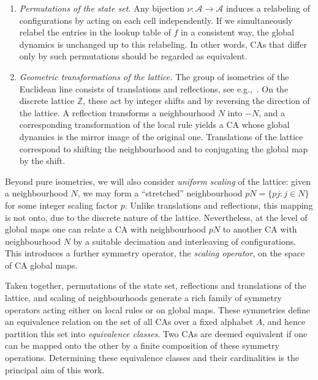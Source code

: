 \documentclass[a4paper]{article}
\begin{document}
\begin{enumerate}
  \item \emph{Permutations of the state set.} Any bijection
        $\nu : \mathcal{A} \to \mathcal{A}$ induces a relabeling of configurations by acting
        on each cell independently. If we simultaneously relabel the entries in
        the lookup table of $f$ in a consistent way, the global dynamics is
        unchanged up to this relabeling. In other words, CAs that differ only
        by such permutations should be regarded as equivalent.

  \item \emph{Geometric transformations of the lattice.} The group of
        isometries of the Euclidean line consists of translations and reflections, see e.g.,~\cite{martin2012transformation}.
        On the discrete lattice $\mathbb{Z}$, these act by integer shifts and by
        reversing the direction of the lattice. A reflection transforms a
        neighbourhood $N$ into $-N$, and a corresponding transformation of
        the local rule yields a CA whose global dynamics is the mirror image of
        the original one. Translations of the lattice correspond to shifting the
        neighbourhood and to conjugating the global map by the shift.
\end{enumerate}

Beyond pure isometries, we will also consider \emph{uniform scaling} of the
lattice: given a neighbourhood $N$, we may form a ``stretched'' neighbourhood
$pN = \{pj : j \in N\}$ for some integer scaling factor $p$. Unlike translations
and reflections, this mapping is not onto, due to the discrete nature of the
lattice. Nevertheless, at the level of global maps one can relate a CA with
neighbourhood $pN$ to another CA with neighbourhood $N$ by a suitable
decimation and interleaving of configurations. This introduces a further
symmetry operator, the \emph{scaling operator}, on the space of CA global maps.

Taken together, permutations of the state set, reflections and translations of
the lattice, and scaling of neighbourhoods generate a rich family of symmetry
operators acting either on local rules or on global maps. These symmetries define
an equivalence relation on the set of all CAs over a fixed alphabet $A$, and
hence partition this set into \emph{equivalence classes}. Two CAs are deemed
equivalent if one can be mapped onto the other by a finite composition of these
symmetry operations. Determining these equivalence classes and their
cardinalities is the principal aim of this work.
\end{document}
